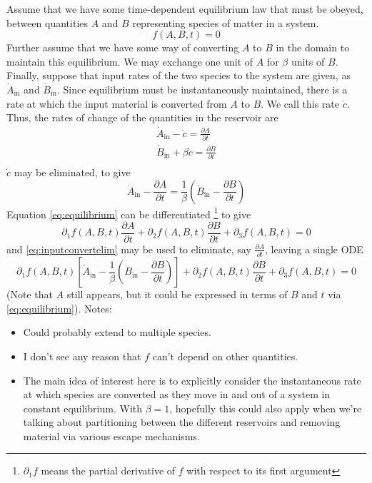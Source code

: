 Assume that we have some time-dependent equilibrium law that must be obeyed, between quantities $A$ and $B$ representing species of matter in a system.
\begin{equation}\label{eq:equilibrium}
f(A,B,t) = 0
\end{equation}
Further assume that we have some way of converting $A$ to $B$ in the domain to maintain this equilibrium. We may exchange one unit of $A$ for $\beta$ units of $B$.  Finally, suppose that input rates of the two species to the system are given, as $\dot A_\text{in}$ and $\dot B_\text{in}$.  Since equilibrium must be instantaneously maintained, there is a rate at which the input material is converted from $A$ to $B$. We call this rate $\dot c$.  Thus, the rates of change of the quantities in the reservoir are
\begin{align}\label{eq:inputconvert}
  \dot A_\text{in} - \dot c = \frac{\partial A}{\partial t} \\
  \dot B_\text{in} + \beta \dot c = \frac{\partial B}{\partial t} \\
\end{align}
$\dot c$ may be eliminated, to give
\begin{equation} \label{eq:inputconvertelim}
  \dot A_\text{in} - \frac{\partial A}{\partial t} = \frac{1}{\beta}\left( \dot B_\text{in} -\frac{\partial B}{\partial t} \right)
\end{equation}
Equation \ref{eq:equilibrium} can be differentiated \footnote{$\partial_1f$ means the partial derivative of $f$ with respect to its first argument} to give
$$
\partial_1f(A,B,t) \frac{\partial A}{\partial t} + \partial_2f(A,B,t)\frac{\partial B}{\partial t} + \partial_3f(A,B,t) = 0
$$
and \ref{eq:inputconvertelim} may be used to eliminate, say  $\frac{\partial A}{\partial t}$, leaving a single ODE
$$
\partial_1f(A,B,t) \left[\dot A_\text{in} - \frac{1}{\beta}\left( \dot B_\text{in} -\frac{\partial B}{\partial t} \right) \right] + \partial_2f(A,B,t)\frac{\partial B}{\partial t} + \partial_3f(A,B,t) = 0
$$
(Note that $A$ still appears, but it could be expressed in terms of $B$ and $t$ via \ref{eq:equilibrium}).
Notes:
\begin{itemize}
  \item Could probably extend to multiple species.
  \item I don't see any reason that $f$ can't depend on other quantities.
  \item The main idea of interest here is to explicitly consider the instantaneous rate at which species are converted as they move in and out of a system in constant equilibrium. With $\beta =1$, hopefully this could also apply when we're talking about partitioning between the different reservoirs and removing material via various escape mechanisms.
\end{itemize}
